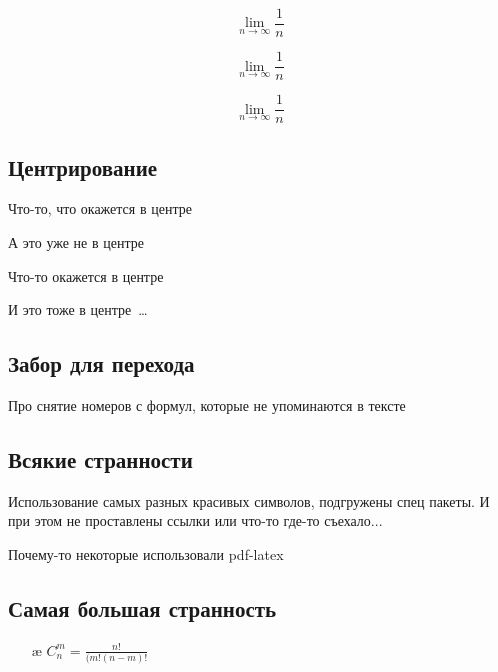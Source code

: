 \documentclass[12pt, a4paper]{article}
\begin{document}
\[ \textstyle \lim \limits_{n \to \infty} \frac{1}{n} \]

\[ \textstyle \lim_{n \to \infty} \frac{1}{n} \]

\[ \lim_{n \to \infty} \frac{1}{n} \]


\subsection{Центрирование}

\begin{center}
Что-то, что окажется в центре
\end{center}

А это уже не в центре

\center Что-то окажется в центре

И это тоже в центре~\ldots 



\subsection{Забор для перехода} 



Про снятие номеров с формул, которые не упоминаются в тексте

\subsection{Всякие странности} 

Использование самых разных красивых символов, подгружены спец пакеты. И при этом не проставлены ссылки или что-то где-то съехало... 

Почему-то некоторые использовали pdf-latex



\subsection{Самая большая странность} 

\begin{enumerate}[label=\setcounter:{what's going on??}] 
\item [æ] $C_n^m=\frac{n!}{(m!(n-m)!}$ \label{f1}
\end{enumerate}
\end{document}
